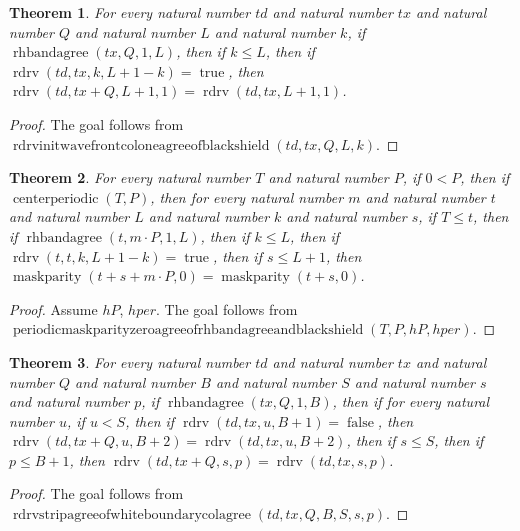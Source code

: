 \documentclass[11pt]{article}
\newtheorem{theorem}{Theorem}[section]
\theoremstyle{definition}
\begin{document}
\begin{theorem}
\label{ll:paper:rdrv-init-wavefront-col-one-agree-of-black-shield}
For every natural number \(td\) and natural number \(tx\) and natural number \(Q\) and natural number \(L\) and natural number \(k\), if \(\operatorname{rhbandagree}(tx, Q, 1, L)\), then if \(k \le L\), then if \(\operatorname{rdrv}(td, tx, k, L + 1 - k) = \operatorname{true}\), then \(\operatorname{rdrv}(td, tx + Q, L + 1, 1) = \operatorname{rdrv}(td, tx, L + 1, 1)\).
\end{theorem}
\begin{proof}
The goal follows from \(\operatorname{rdrvinitwavefrontcoloneagreeofblackshield}(td, tx, Q, L, k)\).
\end{proof}
\begin{theorem}
\label{ll:paper:periodic-maskparity-zero-agree-of-rhbandagree-and-black-shield}
For every natural number \(T\) and natural number \(P\), if \(0 < P\), then if \(\operatorname{centerperiodic}(T, P)\), then for every natural number \(m\) and natural number \(t\) and natural number \(L\) and natural number \(k\) and natural number \(s\), if \(T \le t\), then if \(\operatorname{rhbandagree}(t, m \cdot P, 1, L)\), then if \(k \le L\), then if \(\operatorname{rdrv}(t, t, k, L + 1 - k) = \operatorname{true}\), then if \(s \le L + 1\), then \(\operatorname{maskparity}(t + s + m \cdot P, 0) = \operatorname{maskparity}(t + s, 0)\).
\end{theorem}
\begin{proof}
Assume \(hP\), \(hper\).
The goal follows from \(\operatorname{periodicmaskparityzeroagreeofrhbandagreeandblackshield}(T, P, hP, hper)\).
\end{proof}
\begin{theorem}
\label{ll:paper:rdrv-strip-agree-of-white-boundary-col-agree}
For every natural number \(td\) and natural number \(tx\) and natural number \(Q\) and natural number \(B\) and natural number \(S\) and natural number \(s\) and natural number \(p\), if \(\operatorname{rhbandagree}(tx, Q, 1, B)\), then if for every natural number \(u\), if \(u < S\), then if \(\operatorname{rdrv}(td, tx, u, B + 1) = \operatorname{false}\), then \(\operatorname{rdrv}(td, tx + Q, u, B + 2) = \operatorname{rdrv}(td, tx, u, B + 2)\), then if \(s \le S\), then if \(p \le B + 1\), then \(\operatorname{rdrv}(td, tx + Q, s, p) = \operatorname{rdrv}(td, tx, s, p)\).
\end{theorem}
\begin{proof}
The goal follows from \(\operatorname{rdrvstripagreeofwhiteboundarycolagree}(td, tx, Q, B, S, s, p)\).
\end{proof}
\end{document}
